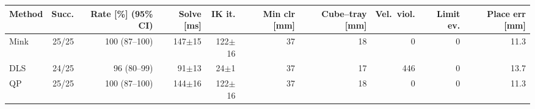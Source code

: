 \begin{tabular}{lrrrrrrrrr}
\toprule
Method & Succ. & Rate [\%] (95\% CI) & Solve [ms] & IK it. & Min clr [mm] & Cube--tray [mm] & Vel.\ viol. & Limit ev. & Place err [mm]\\
\midrule
Mink & 25/25 & 100 (87--100) & 147$\pm$15 & 122$\pm$16 & 37 & 18 & 0 & 0 & 11.3\\
DLS & 24/25 & 96 (80--99) & 91$\pm$13 & 24$\pm$1 & 37 & 17 & 446 & 0 & 13.7\\
QP & 25/25 & 100 (87--100) & 144$\pm$16 & 122$\pm$16 & 37 & 18 & 0 & 0 & 11.3\\
\bottomrule
\end{tabular}
